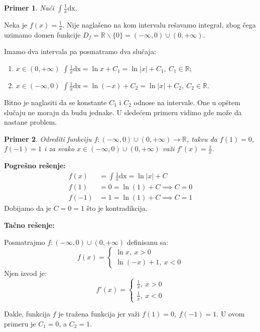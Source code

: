\documentclass{article}
\newtheorem{prim}{Primer}[section]
\begin{document}
\begin{primbox}
    \begin{prim}
        Naći $\int\frac{1}{x}\text{dx}$.
    \end{prim}
    Neka je $f(x) = \frac{1}{x}$.
    Nije naglašeno na kom intervalu rešavamo integral, zbog čega uzimamo domen
    funkcije
    $D_f= \mathbb{R}\backslash \{0\} = (-\infty, 0)\cup(0, +\infty)$.\par
    Imamo dva intervala pa posmatramo dva slučaja:
    \begin{enumerate}[leftmargin=2cm, label=\arabic*. slučaj:]
        \item $x \in (0, +\infty)$ $\int \frac{1}{x}\text{dx} =
                  \ln x + C_1=\ln|x| + C_1,\ C_1\in\mathbb{R}$;
        \item $x \in (-\infty, 0)$ $\int \frac{1}{x}\text{dx} =
                  \ln(-x) + C_2=\ln|x| + C_2,\ C_2\in\mathbb{R}$.
    \end{enumerate}
\end{primbox}

Bitno je naglasiti da se konstante $C_1$ i $C_2$ odnose na intervale. One
u opštem slučaju ne moraju da budu jednake.
U sledećem primeru vidimo gde može da nastane problem.

\begin{primbox}
    \begin{prim}
        Odrediti funkciju $f: (-\infty, 0)\cup(0, +\infty)
            \longrightarrow \mathbb{R}$, takvu da $f(1) = 0$,
        $f(-1) = 1$ i za svako $x \in (-\infty, 0)
            \cup(0, +\infty)$ važi
        $f'(x) = \frac{1}{x}$.
    \end{prim}
    \textbf{Pogrešno rešenje:}
    \begin{align*}
        f(x)  & = \int \frac{1}{x}\text{dx} = \ln|x| + C \\
        f(1)  & = 0 = \ln(1) + C \implies C = 0          \\
        f(-1) & = 1 = \ln(1) + C \implies C = 1
    \end{align*}
    Dobijamo da je $C=0=1$ što je kontradikcija.\par
    \textbf{Tačno rešenje:}\par
    Posmatrajmo $f: (-\infty, 0)\cup(0, +\infty)$
    definisanu sa:
    $$
        f(x) =
        \begin{cases}
            \ln x,\ x > 0 \\
            \ln (-x) + 1,\ x < 0
        \end{cases}
    $$
    Njen izvod je:
    $$f'(x) =
        \begin{cases}
            \frac{1}{x},\ x > 0 \\
            \frac{1}{x},\ x < 0
        \end{cases}$$

    Dakle, funkcija $f$ je tražena funkcija jer važi
    $f(1) = 0,\ f(-1) = 1$. U ovom primeru je $C_1=0$, a $C_2=1$.
\end{primbox}
\end{document}
